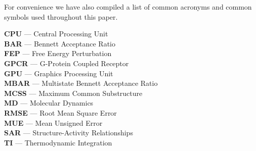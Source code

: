 \documentclass[9pt,bestpractices]{livecoms}
\begin{document}
For convenience we have also compiled a list of common acronyms and common symbols used throughout this paper.
\begin{tcolorbox}[title=Acronyms, colback=blue!10!white]
    {\bf CPU} --- Central Processing Unit\\
     {\bf BAR} --- Bennett Acceptance Ratio\\
     {\bf FEP} --- Free Energy Perturbation\\
     {\bf GPCR} --- G-Protein Coupled Receptor\\
     {\bf GPU} --- Graphics Processing Unit\\
     {\bf MBAR} --- Multistate Bennett Acceptance Ratio\\
     {\bf MCSS} --- Maximum Common Substructure\\
     {\bf MD} --- Molecular Dynamics\\
     {\bf RMSE} --- Root Mean Square Error\\
     {\bf MUE} --- Mean Unsigned Error\\
     {\bf SAR} --- Structure-Activity Relationships\\
     {\bf TI} --- Thermodynamic Integration
\end{tcolorbox}
\end{document}
